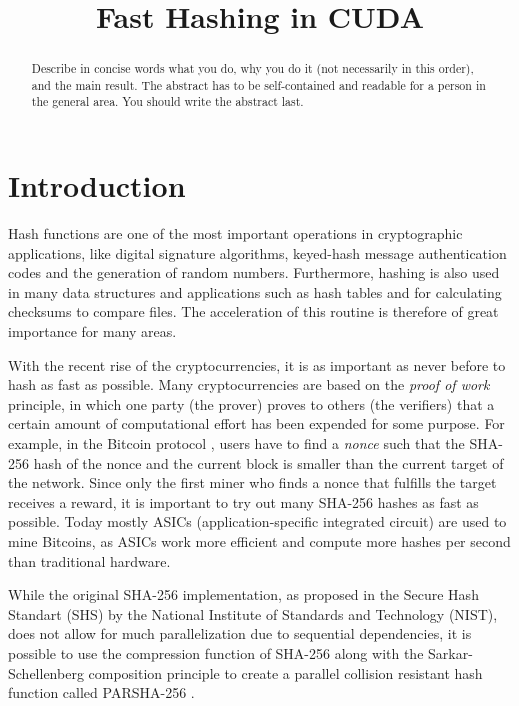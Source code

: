 \documentclass[letterpaper]{article}
\title{Fast Hashing in CUDA}
\begin{document}
%
\maketitle
%


\begin{abstract}
Describe in concise words what you do, why you do it (not necessarily
in this order), and the main result.  The abstract has to be
self-contained and readable for a person in the general area. You
should write the abstract last.
\end{abstract}

\section{Introduction}\label{sec:intro}
Hash functions are one of the most important operations in cryptographic applications, like digital signature algorithms, keyed-hash message authentication codes and the generation of random numbers. Furthermore, hashing is also used in many data structures and applications such as hash tables and for calculating checksums to compare files.  The acceleration of this routine is therefore of great importance for many areas.

With the recent rise of the cryptocurrencies, it is as important as never before to hash as fast as possible. Many cryptocurrencies are based on the \emph{proof of work} \cite{pow} principle, in which one party (the prover) proves to others (the verifiers) that a certain amount of computational effort has been expended for some purpose. For example, in the Bitcoin protocol \cite{nakamoto2012bitcoin}, users have to find a \emph{nonce} such that the SHA-256 hash of the nonce and the current block is smaller than the current target of the network. Since only the first miner who finds a nonce that fulfills the target receives a reward, it is important to try out many SHA-256 hashes as fast as possible. Today mostly ASICs (application-specific integrated circuit) are used to mine Bitcoins, as ASICs work more efficient and compute more hashes per second than traditional hardware.

While the original SHA-256 implementation, as proposed in the Secure Hash Standart (SHS) \cite{sha} by the National Institute of Standards and Technology (NIST), does not allow for much parallelization due to sequential dependencies, it is possible to use the compression function of SHA-256 along with the Sarkar-Schellenberg composition principle \cite{sarkar} to create a parallel collision resistant hash function called PARSHA-256 \cite{parsha256}. 
\end{document}
